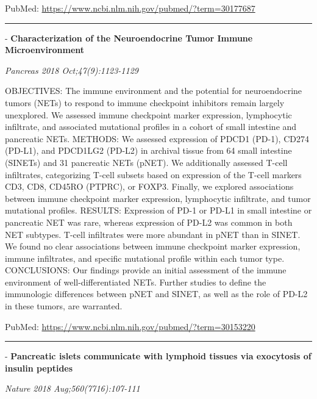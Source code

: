 \documentclass[]{article}
\begin{document}
PubMed: \url{https://www.ncbi.nlm.nih.gov/pubmed/?term=30177687}

{}

{}

\begin{center}\rule{0.5\linewidth}{\linethickness}\end{center}

 - \textbf{Characterization of the Neuroendocrine Tumor Immune
Microenvironment}

\emph{Pancreas 2018 Oct;47(9):1123-1129}

OBJECTIVES: The immune environment and the potential for neuroendocrine
tumors (NETs) to respond to immune checkpoint inhibitors remain largely
unexplored. We assessed immune checkpoint marker expression, lymphocytic
infiltrate, and associated mutational profiles in a cohort of small
intestine and pancreatic NETs. METHODS: We assessed expression of PDCD1
(PD-1), CD274 (PD-L1), and PDCD1LG2 (PD-L2) in archival tissue from 64
small intestine (SINETs) and 31 pancreatic NETs (pNET). We additionally
assessed T-cell infiltrates, categorizing T-cell subsets based on
expression of the T-cell markers CD3, CD8, CD45RO (PTPRC), or FOXP3.
Finally, we explored associations between immune checkpoint marker
expression, lymphocytic infiltrate, and tumor mutational profiles.
RESULTS: Expression of PD-1 or PD-L1 in small intestine or pancreatic
NET was rare, whereas expression of PD-L2 was common in both NET
subtypes. T-cell infiltrates were more abundant in pNET than in SINET.
We found no clear associations between immune checkpoint marker
expression, immune infiltrates, and specific mutational profile within
each tumor type. CONCLUSIONS: Our findings provide an initial assessment
of the immune environment of well-differentiated NETs. Further studies
to define the immunologic differences between pNET and SINET, as well as
the role of PD-L2 in these tumors, are warranted.

PubMed: \url{https://www.ncbi.nlm.nih.gov/pubmed/?term=30153220}

{}

{}

\begin{center}\rule{0.5\linewidth}{\linethickness}\end{center}

 - \textbf{Pancreatic islets communicate with lymphoid tissues via
exocytosis of insulin peptides}

\emph{Nature 2018 Aug;560(7716):107-111}
\end{document}
